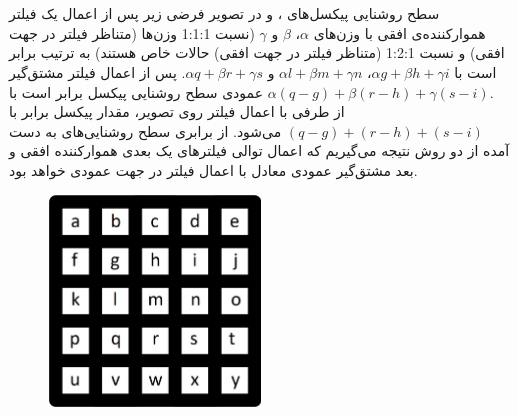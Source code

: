 \documentclass{article}
\begin{document}


\newpage


\section{}%
\subsection{}
سطح روشنایی پیکسل‌های ،  و  در تصویر فرضی زیر پس از اعمال یک فیلتر هموارکننده‌ی افقی با وزن‌های $\alpha$، $\beta$ و $\gamma$ (نسبت 1:1:1 وزن‌ها (متناظر فیلتر  در جهت افقی) و نسبت 1:2:1 (متناظر فیلتر  در جهت افقی) حالات خاص هستند) به ترتیب برابر است با
$
\alpha g + \beta h + \gamma i
$،
$
\alpha l + \beta m + \gamma n
$
و
$
\alpha q + \beta r + \gamma s
$.
پس از اعمال فیلتر مشتق‌گیر عمودی سطح روشنایی پیکسل  برابر است با 
$
\alpha (q - g) + \beta (r - h) + \gamma (s - i)
$. \\
از طرفی با اعمال فیلتر  روی تصویر، مقدار پیکسل  برابر با 
$
(q - g) + (r - h) + (s - i)
$
می‌شود. از برابری سطح روشنایی‌های به دست آمده از دو روش نتیجه می‌گیریم که اعمال توالی فیلترهای یک بعدی هموارکننده افقی و بعد مشتق‌گیر عمودی معادل با اعمال فیلتر  در جهت عمودی خواهد بود.
\begin{figure}[H]
    \centering
    \includegraphics[width=0.5\textwidth]{figures/1p1.jpg}
    \caption
	{}
    \label{fig:fig1}
\end{figure}
\end{document}

